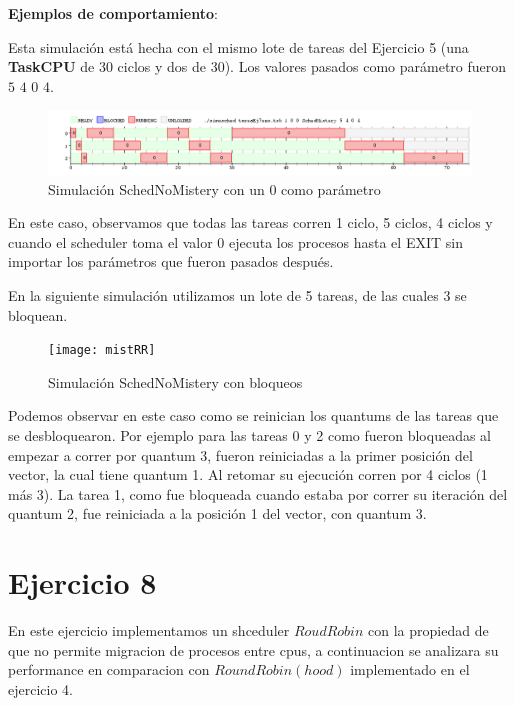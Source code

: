 \documentclass[11pt]{article}
\begin{document}
  \vspace{1mm}
  \textbf{Ejemplos de comportamiento}:
  \vspace{1mm}

  Esta simulación está hecha con el mismo lote de tareas del Ejercicio 5 (una \textbf{TaskCPU} de 30 ciclos y dos de 30). 
  Los valores pasados como parámetro fueron $5$ $4$ $0$ $4$.


        \begin{figure}[H]
          \includegraphics[scale=0.5]{Ej7Ej1}
          \caption{Simulación SchedNoMistery con un 0 como parámetro} 
        \end{figure}

  En este caso, observamos que todas las tareas corren 1 ciclo, 5 ciclos, 4 ciclos y cuando el scheduler toma el valor 0 ejecuta los procesos hasta el EXIT sin importar los parámetros que fueron pasados después.  

  En la siguiente simulación utilizamos un lote de 5 tareas, de las cuales 3 se bloquean.


        \begin{figure}[H]
          \texttt{[image: mistRR]}
          \caption{Simulación SchedNoMistery con bloqueos} 
        \end{figure}

  Podemos observar en este caso como se reinician los quantums de las tareas que se desbloquearon. Por ejemplo para las tareas 0 y 2 como fueron 
  bloqueadas al empezar a correr por quantum 3, fueron reiniciadas a la primer posición del vector, la cual tiene quantum 1. Al retomar su ejecución 
  corren por 4 ciclos (1 más 3). La tarea 1, como fue bloqueada cuando estaba por correr su iteración del quantum 2, fue reiniciada a la posición 
  1 del vector, con quantum 3.

  \newpage

  \section{Ejercicio 8}
  En este ejercicio implementamos un shceduler $Roud Robin$ con la propiedad de que no permite migracion de procesos entre cpus, a continuacion se analizara su performance en comparacion con $Round Robin(hood)$ implementado en el ejercicio 4. \\
\end{document}
